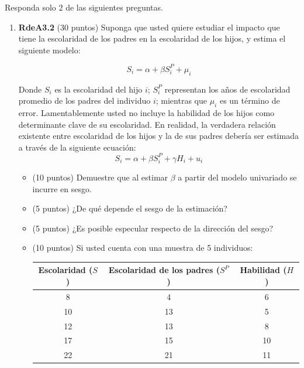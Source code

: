 \documentclass[10pt,a4paper]{article}
\begin{document}
Responda solo 2 de las siguientes preguntas.
\begin{enumerate}
      \item \textbf{RdeA3.2} (30 puntos) 
      Suponga que usted quiere estudiar el impacto que tiene la escolaridad de los padres en la escolaridad de los hijos, y estima el siguiente modelo:

\begin{equation}
    S_i = \alpha + \beta S^P_i + \mu_i
\end{equation}


      Donde $S_i$ es la escolaridad del hijo $i$; $S^P_i$ representan los años de escolaridad promedio de los padres del individuo $i$; mientras que $\mu_i$ es un término de error. Lamentablemente usted no incluye la habilidad de los hijos como determinante clave de su escolaridad. En realidad, la verdadera relación existente entre escolaridad de los hijos y la de sus padres debería ser estimada a través de la siguiente ecuación:
\begin{equation}
    S_i = \alpha + \beta S^P_i + \gamma H_i + u_i
\end{equation}

        \begin{itemize}
            \item [a)] (10 puntos) Demuestre que al estimar $\beta$ a partir del modelo univariado se incurre en sesgo.

            

            \item [b)] (5 puntos) ¿De qué depende el sesgo de la estimación?
            \item [c)] (5 puntos) ¿Es posible especular respecto de la dirección del sesgo?


            \item [d)] (10 puntos) Si usted cuenta con una muestra de 5 individuos:

            \begin{table}[H]
                \centering
                \begin{tabular}{c|c|c}
                 Escolaridad ($S$) & Escolaridad de los padres ($S^P$)& Habilidad ($H$) \\ \hline
                 8&4&6\\  
                 10&13&5\\ 
                 12&13&8\\ 
                 17&15&10\\ 
                 22&21&11\\ 
                \end{tabular}
                \label{tab:placeholder}
            \end{table}


\end{itemize}
\end{enumerate}
\end{document}
